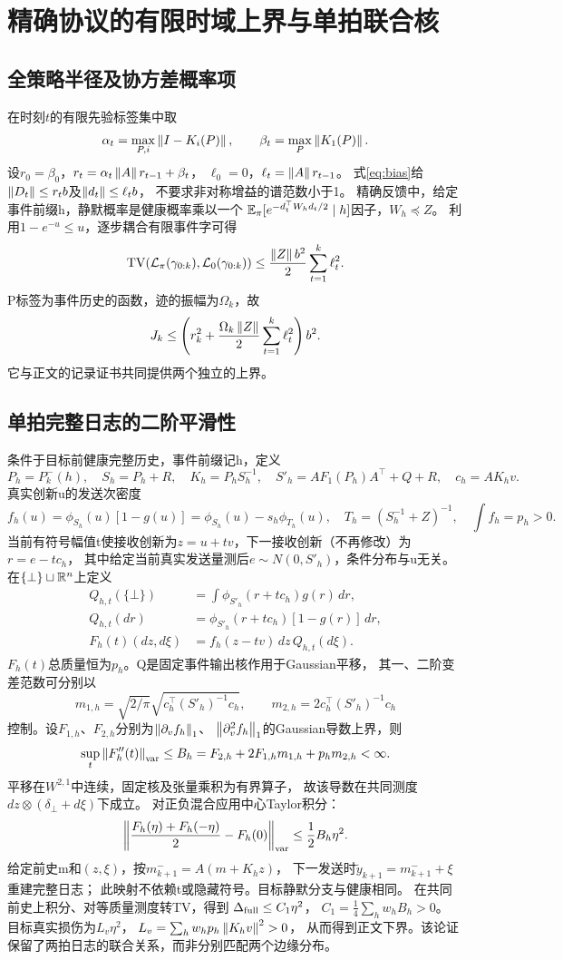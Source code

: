 \section{精确协议的有限时域上界与单拍联合核}
\label{app:single}
\subsection{全策略半径及协方差概率项}
在时刻$t$的有限先验标签集中取
\[
\alpha_t=\max_{P,i}\left\|I-K_i(P)\right\|,\qquad \beta_t=\max_P\left\|K_1(P)\right\|.
\]
设$r_0=\beta_0$，$r_t=\alpha_t\left\|A\right\| r_{t-1}+\beta_t$，
$\ell_0=0$，$\ell_t=\left\|A\right\| r_{t-1}$。
式\eqref{eq:bias}给$\left\|D_t\right\|\le r_tb$及$\left\|d_t\right\|\le\ell_tb$，
不要求非对称增益的谱范数小于1。
精确反馈中，给定事件前缀h，静默概率是健康概率乘以一个
$\mathbb E_\pi[e^{-d_t^\top W_hd_t/2}\mid h]$因子，$W_h\preceq Z$。
利用$1-e^{-u}\le u$，逐步耦合有限事件字可得
\[
\operatorname{TV}(\mathcal L_\pi(\gamma_{0:k}),\mathcal L_0(\gamma_{0:k}))
\le\frac{\left\|Z\right\| b^2}{2}\sum_{t=1}^k\ell_t^2.
\]
P标签为事件历史的函数，迹的振幅为$\Omega_k$，故
\[
J_k\le
\left(r_k^2+\frac{\Omega_k\left\|Z\right\|}{2}\sum_{t=1}^k\ell_t^2\right)b^2.
\]
它与正文的记录证书共同提供两个独立的上界。

\subsection{单拍完整日志的二阶平滑性}
条件于目标前健康完整历史，事件前缀记h，定义
\[
P_h=P_k^-(h),\quad S_h=P_h+R,\quad K_h=P_hS_h^{-1},\quad
S'_h=AF_1(P_h)A^\top+Q+R,\quad c_h=AK_hv.
\]
真实创新u的发送次密度
\[
f_h(u)=\phi_{S_h}(u)[1-g(u)]
=\phi_{S_h}(u)-s_h\phi_{T_h}(u),\quad
T_h=(S_h^{-1}+Z)^{-1},\quad \int f_h=p_h>0.
\]
当前有符号幅值t使接收创新为$z=u+tv$，下一接收创新（不再修改）为$r=e-tc_h$，
其中给定当前真实发送量测后$e\sim N(0,S'_h)$，条件分布与u无关。
在$\{\bot\}\sqcup\mathbb R^n$上定义
\begin{align*}
Q_{h,t}(\{\bot\})&=\int\phi_{S'_h}(r+tc_h)g(r)\,dr,\\
Q_{h,t}(dr)&=\phi_{S'_h}(r+tc_h)[1-g(r)]\,dr,\\
F_h(t)(dz,d\xi)&=f_h(z-tv)\,dz\,Q_{h,t}(d\xi).
\end{align*}
$F_h(t)$总质量恒为$p_h$。Q是固定事件输出核作用于Gaussian平移，
其一、二阶变差范数可分别以
\[
m_{1,h}=\sqrt{2/\pi}\sqrt{c_h^\top(S'_h)^{-1}c_h},\qquad
m_{2,h}=2c_h^\top(S'_h)^{-1}c_h
\]
控制。设$F_{1,h}$、$F_{2,h}$分别为$\left\|\partial_vf_h\right\|_1$、
$\left\|\partial_v^2f_h\right\|_1$的Gaussian导数上界，则
\[
\sup_t\left\|F_h''(t)\right\|_{\rm var}
\le B_h=F_{2,h}+2F_{1,h}m_{1,h}+p_hm_{2,h}<\infty.
\]
平移在$W^{2,1}$中连续，固定核及张量乘积为有界算子，
故该导数在共同测度$dz\otimes(\delta_\bot+d\xi)$下成立。
对正负混合应用中心Taylor积分：
\[
\left\|\frac{F_h(\eta)+F_h(-\eta)}2-F_h(0)\right\|_{\rm var}
\le\frac12B_h\eta^2.
\]
给定前史m和$(z,\xi)$，按$m_{k+1}^-=A(m+K_hz)$，
下一发送时$\tilde y_{k+1}=m_{k+1}^-+\xi$重建完整日志；
此映射不依赖t或隐藏符号。目标静默分支与健康相同。
在共同前史上积分、对等质量测度转TV，得到
$\Delta_{\rm full}\le C_1\eta^2$，
$C_1=\frac14\sum_hw_hB_h>0$。
目标真实损伤为$L_v\eta^2$，
$L_v=\sum_hw_hp_h\left\|K_hv\right\|^2>0$，
从而得到正文下界。该论证保留了两拍日志的联合关系，而非分别匹配两个边缘分布。


